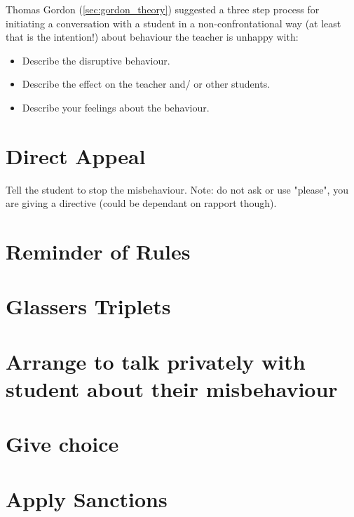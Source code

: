 \documentclass[12pt]{report}
\begin{document}
Thomas Gordon (\ref{sec:gordon_theory}) suggested a three step process for initiating a conversation with a student in a non-confrontational way (at least that is the intention!)  about behaviour the teacher is unhappy with:
\begin{itemize}
  \item Describe the disruptive behaviour.
  \item Describe the effect on the teacher and/ or other students.
  \item Describe your feelings about the behaviour.
\end{itemize}

\section{Direct Appeal}
\label{sec:direct_appeal_c}

Tell the student to stop the misbehaviour. Note: do not ask or use "please", you are giving a directive (could be dependant on rapport though).



\section{Reminder of Rules}





\section{Glassers Triplets}



\section{Arrange to talk privately with student about their misbehaviour}
\label{sec:private_talk_c}

\section{Give choice}
\label{sec:give choice_c}

\section{Apply Sanctions}
\label{sec:sanctions_c}
\end{document}
